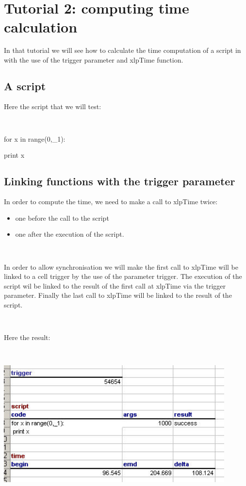 \chapter{Tutorial 2: computing time calculation}


In that tutorial we will see how to calculate the time computation of a script in \xlp with the use of the trigger parameter and xlpTime function.

\section{A script}

Here the script that we will test:

\

for x in range(0,\_1):

 print x
 
 
\section{Linking functions with the trigger parameter}

In order to compute the time, we need to make a call to xlpTime twice:
\begin{itemize}
\item one before the call to the script
\item one after the execution of the script.
\end{itemize}

\

In order to allow synchronisation we will make the first call to xlpTime will be linked to a cell trigger by the use of the parameter trigger. The execution of the script wil be linked to the result of the first call at xlpTime via the trigger parameter. Finally the last call to xlpTime will be linked to the result of the script.

\

Here the result:

\

\includegraphics[width=12cm]{images/timecomp.jpg}

\

